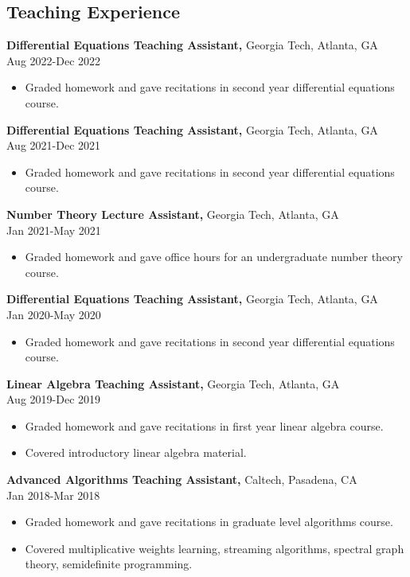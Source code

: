 \documentclass[margin]{res}
\begin{document}
\begin{resume}
\section{Teaching Experience}
{\bf Differential Equations Teaching Assistant,} Georgia Tech, Atlanta, GA \\ Aug 2022-Dec 2022
\begin{itemize} \itemsep -2pt %
    \item Graded homework and gave recitations in second year differential equations course.
\end{itemize}
{\bf Differential Equations Teaching Assistant,} Georgia Tech, Atlanta, GA \\ Aug 2021-Dec 2021
\begin{itemize} \itemsep -2pt %
    \item Graded homework and gave recitations in second year differential equations course.
\end{itemize}
{\bf Number Theory Lecture Assistant,} Georgia Tech, Atlanta, GA \\ Jan 2021-May 2021
\begin{itemize} \itemsep -2pt %
    \item Graded homework and gave office hours for an undergraduate number theory course.
\end{itemize}
{\bf Differential Equations Teaching Assistant,} Georgia Tech, Atlanta, GA \\ Jan 2020-May 2020
\begin{itemize} \itemsep -2pt %
    \item Graded homework and gave recitations in second year differential equations course.
\end{itemize}

{\bf Linear Algebra Teaching Assistant,} Georgia Tech, Atlanta, GA \\ Aug 2019-Dec 2019
\begin{itemize} \itemsep -2pt %
    \item Graded homework and gave recitations in first year linear algebra course.
    \item Covered introductory linear algebra material.
\end{itemize}
 
{\bf Advanced Algorithms Teaching Assistant,} Caltech, Pasadena, CA \\ Jan 2018-Mar 2018
\begin{itemize} \itemsep -2pt %
\item Graded homework and gave recitations in graduate level algorithms course.
\item Covered multiplicative weights learning, streaming algorithms,
spectral graph theory, semidefinite programming.
\end{itemize}
 

\end{resume}
\end{document}
